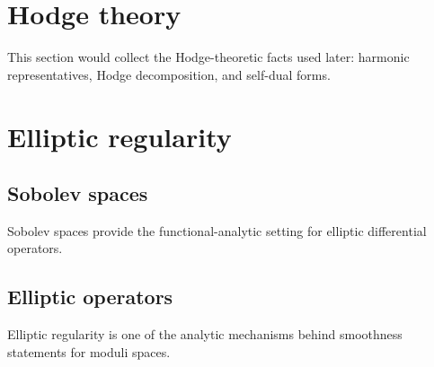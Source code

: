 \section{Hodge theory}
This section would collect the Hodge-theoretic facts used later: harmonic representatives, Hodge decomposition, and self-dual forms.

\section{Elliptic regularity}
\subsection{Sobolev spaces}
Sobolev spaces provide the functional-analytic setting for elliptic differential operators.

\subsection{Elliptic operators}
Elliptic regularity is one of the analytic mechanisms behind smoothness statements for moduli spaces.
